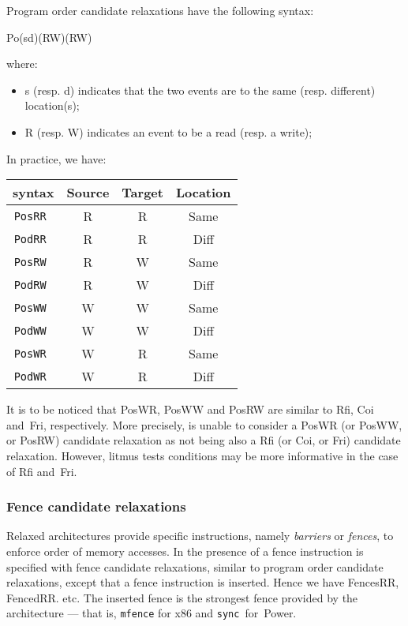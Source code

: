 Program order candidate relaxations have the following syntax:
\begin{center}
Po(s\vbar{}d)(R\vbar{}W)(R\vbar{}W)
\end{center}
where:
\begin{itemize}
\item s (resp. d) indicates that the two events are to the same (resp. different)
location(s);
\item R (resp. W) indicates an event to be a  read (resp. a write);
\end{itemize}

In practice, we have:
\begin{center}
\begin{tabular}{c|c|c|c}
\diy{} syntax  &  Source & Target  & Location \\ \hline
\tt PosRR & R & R & Same \\ \hline
\tt PodRR & R & R & Diff  \\ \hline
\tt PosRW & R & W & Same \\ \hline
\tt PodRW & R & W & Diff \\ \hline
\tt PosWW & W & W & Same \\ \hline
\tt PodWW & W & W & Diff \\ \hline
\tt PosWR & W & R & Same \\ \hline
\tt PodWR & W & R & Diff \\ \hline
\end{tabular}
\end{center}
It is to be noticed
that PosWR, PosWW and PosRW are similar to Rfi, Coi and~Fri, respectively.
More precisely, \diy{} is unable to consider a PosWR (or PosWW, or PosRW)
candidate relaxation as not being also a Rfi (or Coi, or Fri) candidate
relaxation.
However, litmus tests conditions may be more informative in the case of
Rfi and~Fri.




\subsubsection{Fence candidate relaxations}
Relaxed architectures provide specific instructions, namely \emph{barriers}
or \emph{fences}, to enforce order of memory accesses.
In \diy{} the presence of a fence instruction is specified with
fence candidate relaxations, similar to program order candidate relaxations,
except that a fence instruction is inserted.
Hence we have FencesRR, FencedRR. etc.
The inserted fence is the strongest fence provided by
the architecture --- that is, \texttt{mfence} for x86 and
\texttt{sync}~for~Power.

